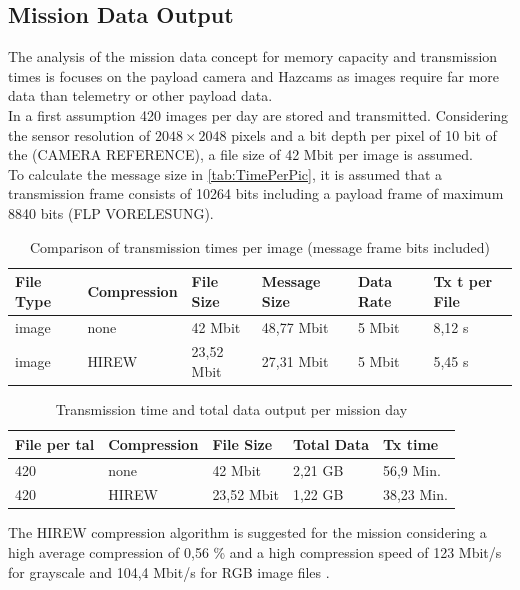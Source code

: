 \subsection{Mission Data Output}
\label{app:MissionDataOutput}

The analysis of the mission data concept for memory capacity and transmission times is focuses on the payload camera and Hazcams as images require far more data than telemetry or other payload data. \\

In a first assumption 420 images per day are stored and transmitted. Considering the sensor resolution of $2048\times2048$ pixels and a bit depth per pixel of 10 bit of the (CAMERA REFERENCE), a file size of 42 Mbit per image is assumed.\\
To calculate the message size in \autoref{tab:TimePerPic}, it is assumed that a transmission frame consists of 10264 bits including a payload frame of maximum 8840 bits (FLP VORELESUNG).   

\begin{table}[h]
\centering
\begin{tabular}{llllll}
File Type & Compression    & File Size  & Message Size & Data Rate & Tx t per File \\ \hline\hline
image     & none           & 42 Mbit    & 48,77 Mbit   & 5 Mbit    & 8,12 s        \\
image     & HIREW          & 23,52 Mbit & 27,31 Mbit   & 5 Mbit    & 5,45 s        \\ \hline
\end{tabular}
\caption{Comparison of transmission times per image (message frame bits included)}
\label{tab:TimePerPic}
\end{table}

\begin{table}[h]
\centering
\begin{tabular}{lllll}
File per tal & Compression & File Size  & Total Data & Tx time    \\ \hline\hline
420          & none        & 42 Mbit    & 2,21 GB    & 56,9 Min.  \\
420          & HIREW       & 23,52 Mbit & 1,22 GB    & 38,23 Min. \\ \hline
\end{tabular}
\caption{Transmission time and total data output per mission day}
\label{tab:Tx-tptal}
\end{table}

The HIREW compression algorithm is suggested for the mission considering a high average compression of 0,56 \% and a high compression speed of 123 Mbit/s for grayscale and 104,4 Mbit/s for RGB image files \cite{HIREW}. 

